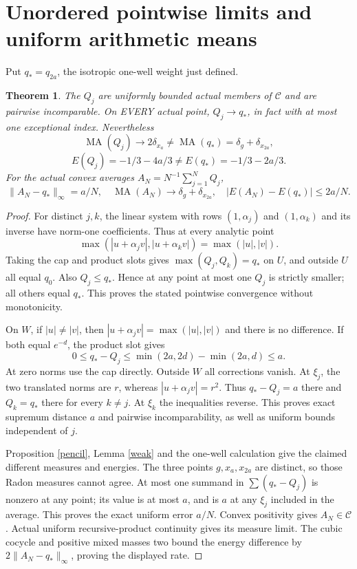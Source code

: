 \documentclass[11pt]{article}
\newtheorem{theorem}{Theorem}
\newcommand{\MA}{\operatorname{MA}}
\newcommand{\C}{\mathcal C}
\begin{document}
\section{Unordered pointwise limits and uniform arithmetic means}
Put $q_*=q_{2a}$, the isotropic one-well weight just defined.
\begin{theorem}\label{unordered}
The $Q_j$ are uniformly bounded actual members of $\C$ and are pairwise
incomparable. On EVERY actual point, $Q_j\to q_*$, in fact with at most
one exceptional index. Nevertheless
\[
 \MA(Q_j)\longrightarrow2\delta_{x_a}\ne
 \MA(q_*)=\delta_g+\delta_{x_{2a}},
\]
\[
 E(Q_j)=-1/3-4a/3\ne E(q_*)=-1/3-2a/3.
\]
For the actual convex averages $A_N=N^{-1}\sum_{j=1}^NQ_j$,
\[
 \|A_N-q_*\|_\infty=a/N,\quad
 \MA(A_N)\longrightarrow\delta_g+\delta_{x_{2a}},\quad
 |E(A_N)-E(q_*)|\le2a/N.
\]
\end{theorem}
\begin{proof}
For distinct $j,k$, the linear system with rows $(1,\alpha_j)$ and
$(1,\alpha_k)$ and its inverse have norm-one coefficients. Thus at every
analytic point
\[
 \max(|u+\alpha_jv|,|u+\alpha_kv|)=\max(|u|,|v|).
\]
Taking the cap and product slots gives $\max(Q_j,Q_k)=q_*$ on $U$,
and outside $U$ all equal $q_0$. Also $Q_j\le q_*$. Hence at any point
at most one $Q_j$ is strictly smaller; all others equal $q_*$. This
proves the stated pointwise convergence without monotonicity.

On $W$, if $|u|\ne|v|$, then $|u+\alpha_jv|=\max(|u|,|v|)$ and
there is no difference. If both equal $e^{-d}$, the product slot gives
\[
 0\le q_*-Q_j\le\min(2a,2d)-\min(2a,d)\le a.
\]
At zero norms use the cap directly. Outside $W$ all corrections vanish.
At $\xi_j$, the two translated norms are $r$, whereas
$|u+\alpha_jv|=r^2$. Thus $q_*-Q_j=a$ there and $Q_k=q_*$ there for
every $k\ne j$. At $\xi_k$ the inequalities reverse. This proves exact
supremum distance $a$ and pairwise incomparability, as well as uniform
bounds independent of $j$.

Proposition \ref{pencil}, Lemma \ref{weak} and the one-well calculation
give the claimed different measures and energies. The three points
$g,x_a,x_{2a}$ are distinct, so those Radon measures cannot agree.
At most one summand in $\sum(q_*-Q_j)$ is nonzero at any point; its
value is at most $a$, and is $a$ at any $\xi_j$ included in the average.
This proves the exact uniform error $a/N$. Convex positivity gives
$A_N\in\C$. Actual uniform recursive-product continuity gives its measure
limit. The cubic cocycle and positive mixed masses two bound the energy
difference by $2\|A_N-q_*\|_\infty$, proving the displayed rate.
\end{proof}
\end{document}
